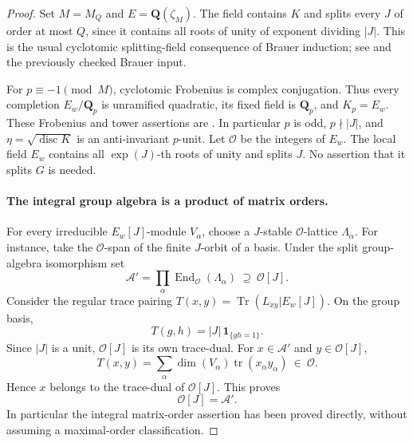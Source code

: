 \begin{proof}
Set $M=M_Q$ and $E=\mathbf Q(\zeta_M)$.
The field contains $K$ and splits every $J$ of order at most $Q$,
since it contains all roots of unity of exponent dividing $|J|$.
This is the usual cyclotomic splitting-field consequence of
Brauer induction; see
\cite[Corollary 4.6.12 and its proof]{OG:Zheng2025}
and the previously checked Brauer input.

For $p\equiv-1\pmod M$, cyclotomic Frobenius is complex
conjugation.  Thus every completion $E_w/\mathbf Q_p$ is
unramified quadratic, its fixed field is $\mathbf Q_p$, and
$K_p=E_w$.  These Frobenius and tower assertions are
\cite[8.15--8.18, pp.~142--143]{PD:MilneANT}.
In particular $p$ is odd, $p\nmid |J|$, and
$\eta=\sqrt{\operatorname{disc}K}$ is an anti-invariant $p$-unit.
Let $\mathcal O$ be the integers of $E_w$.
The local field $E_w$ contains all $\exp(J)$-th roots of unity
and splits $J$.  No assertion that it splits $G$ is needed.

\paragraph{The integral group algebra is a product of matrix orders.}
For every irreducible $E_w[J]$-module $V_\alpha$, choose a
$J$-stable $\mathcal O$-lattice $\Lambda_\alpha$.  For instance,
take the $\mathcal O$-span of the finite $J$-orbit of a basis.
Under the split group-algebra isomorphism set
\[
 \mathcal A'=\prod_\alpha
       \operatorname{End}_{\mathcal O}(\Lambda_\alpha)
       \ \supseteq\ \mathcal O[J].
 \tag{PD.10}
\]
Consider the regular trace pairing
$T(x,y)=\operatorname{Tr}(L_{xy}|E_w[J])$.
On the group basis,
\[
             T(g,h)=|J|\,\mathbf 1_{\{gh=1\}}.
 \tag{PD.11}
\]
Since $|J|$ is a unit, $\mathcal O[J]$ is its own trace-dual.
For $x\in\mathcal A'$ and $y\in\mathcal O[J]$,
\[
 T(x,y)=\sum_\alpha \dim(V_\alpha)
                       \operatorname{tr}(x_\alpha y_\alpha)
                       \ \in\ \mathcal O.
 \tag{PD.12}
\]
Hence $x$ belongs to the trace-dual of $\mathcal O[J]$.
This proves
\[
                  \mathcal O[J]=\mathcal A'.
 \tag{PD.13}
\]
In particular the integral matrix-order assertion has been
proved directly, without assuming a maximal-order classification.


\end{proof}
